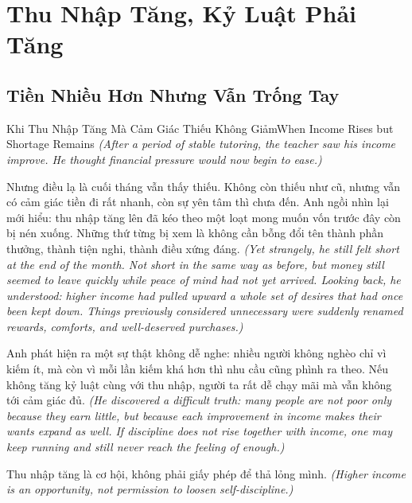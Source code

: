 \chapter{Thu Nhập Tăng, Kỷ Luật Phải Tăng}

\section{Tiền Nhiều Hơn Nhưng Vẫn Trống Tay}
\begin{truyen}{Khi Thu Nhập Tăng Mà Cảm Giác Thiếu Không Giảm}{When Income Rises but Shortage Remains}
\textit{(After a period of stable tutoring, the teacher saw his income improve. He thought financial pressure would now begin to ease.)}

Nhưng điều lạ là cuối tháng vẫn thấy thiếu. Không còn thiếu như cũ, nhưng vẫn có cảm giác tiền đi rất nhanh, còn sự yên tâm thì chưa đến. Anh ngồi nhìn lại mới hiểu: thu nhập tăng lên đã kéo theo một loạt mong muốn vốn trước đây còn bị nén xuống. Những thứ từng bị xem là không cần bỗng đổi tên thành phần thưởng, thành tiện nghi, thành điều xứng đáng.
\textit{(Yet strangely, he still felt short at the end of the month. Not short in the same way as before, but money still seemed to leave quickly while peace of mind had not yet arrived. Looking back, he understood: higher income had pulled upward a whole set of desires that had once been kept down. Things previously considered unnecessary were suddenly renamed rewards, comforts, and well-deserved purchases.)}

Anh phát hiện ra một sự thật không dễ nghe: nhiều người không nghèo chỉ vì kiếm ít, mà còn vì mỗi lần kiếm khá hơn thì nhu cầu cũng phình ra theo. Nếu không tăng kỷ luật cùng với thu nhập, người ta rất dễ chạy mãi mà vẫn không tới cảm giác đủ.
\textit{(He discovered a difficult truth: many people are not poor only because they earn little, but because each improvement in income makes their wants expand as well. If discipline does not rise together with income, one may keep running and still never reach the feeling of enough.)}
\end{truyen}

\begin{baihoc}
Thu nhập tăng là cơ hội, không phải giấy phép để thả lỏng mình.
\textit{(Higher income is an opportunity, not permission to loosen self-discipline.)}
\end{baihoc}

